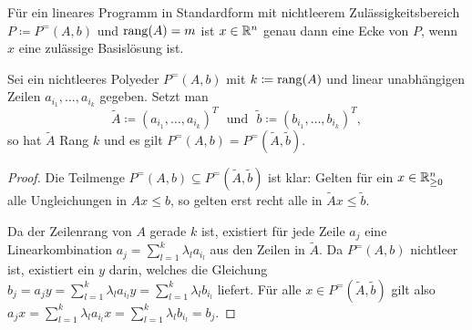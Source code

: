 \begin{satz}\label{satz-ecke-basislsg}
Für ein lineares Programm in Standardform mit nichtleerem Zulässigkeitsbereich $P\coloneq P^=(A,b)$ und $\operatorname{rang}(A) = m$ ist $x\in\mathbb{R}^n$ genau dann eine Ecke von $P$, wenn $x$ eine zulässige Basislösung ist.
\end{satz}

\begin{proposition}\label{prop-rank-obda-m}
	Sei ein nichtleeres Polyeder $P^=(A, b)$ mit $k\coloneq \operatorname{rang}(A)$ und linear unabhängigen Zeilen $a_{i_1},\dots, a_{i_k}$ gegeben.
	Setzt man \[
	\tilde{A}\coloneq (a_{i_1}, \dots, a_{i_k})^T\text{~ und ~}\tilde{b}\coloneq (b_{i_1}, \dots, b_{i_k})^T, \]
	 so hat $\tilde{A}$ Rang $k$ und es gilt $P^=(A,b) = P^=(\tilde{A}, \tilde{b})$.
\end{proposition}
\begin{proof}
	Die Teilmenge $P^=(A,b)\subseteq P^=(\tilde{A}, \tilde{b})$ ist klar:
	Gelten für ein $x\in\mathbb{R}^n_{\geq0}$ alle Ungleichungen in $Ax \leq b$, so gelten erst recht alle in $\tilde{A}x \leq \tilde{b}$.
	
	Da der Zeilenrang von $A$ gerade $k$ ist, existiert für jede Zeile $a_j$ eine Linearkombination $a_j=\sum_{l=1}^k \lambda_l a_{i_l}$ aus den Zeilen in $\tilde{A}$.
	Da $P^=(A,b)$ nichtleer ist, existiert ein $y$ darin, welches die Gleichung
	$b_j = a_j y = \sum_{l=1}^k \lambda_l a_{i_l} y = \sum_{l=1}^k \lambda_l b_{i_l}$ liefert.
	Für alle $x\in P^=(\tilde{A}, \tilde{b})$ gilt also $a_j x = \sum_{l=1}^k \lambda_l a_{i_l} x = \sum_{l=1}^k \lambda_l b_{i_l} = b_j$.
\end{proof}

\clearpage

